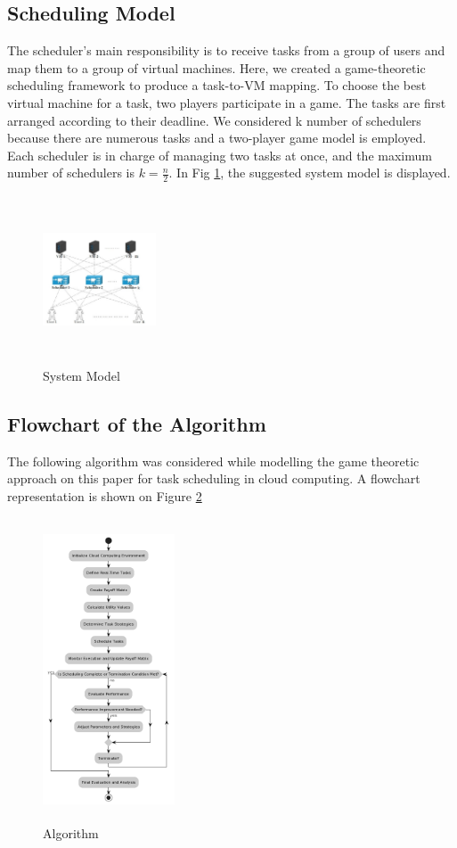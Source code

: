 \documentclass[conference]{IEEEtran}
\begin{document}
\subsection{Scheduling Model}
The scheduler's main responsibility is to receive tasks from a group of users and map them to a group of virtual machines. Here, we created a game-theoretic scheduling framework to produce a task-to-VM mapping. To choose the best virtual machine for a task, two players participate in a game. The tasks are first arranged according to their deadline. We considered k number of schedulers because there are numerous tasks and a two-player game model is employed. Each scheduler is in charge of managing two tasks at once, and the maximum number of schedulers is $k = \frac{n}{2}$. In Fig \ref{Fig 2}, the suggested system model is displayed.
\begin{figure}[h]
  \centering
  \includegraphics[width=0.3\textwidth, height=5cm]{Figures/Fig 1.png}
  \caption{System Model\cite{patra2019game}}
  \label{Fig 2}
\end{figure}

\subsection{Flowchart of the Algorithm}
The following algorithm was considered while modelling the game theoretic approach on this paper for task scheduling in cloud computing. A flowchart representation is shown on Figure \ref{Fig 1}
\begin{figure}[h]
  \centering
  \includegraphics[width=0.35\textwidth, height=9cm]{Figures/Algorithom.png}
  \caption{Algorithm}
  \label{Fig 1}
\end{figure}
\end{document}
